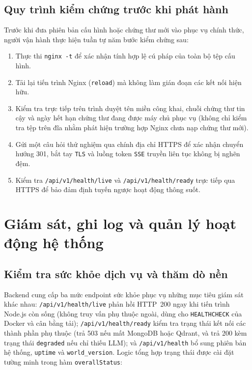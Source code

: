 \subsection{Quy trình kiểm chứng trước khi phát hành}
\label{subsec:kiem-chung-phat-hanh}

Trước khi đưa phiên bản cấu hình hoặc chứng thư mới vào phục vụ chính thức, người vận hành thực hiện tuần tự năm bước kiểm chứng sau:

\begin{enumerate}
    \item Thực thi \texttt{nginx -\allowbreak{}t} để xác nhận tính hợp lệ cú pháp của toàn bộ tệp cấu hình.
    \item Tải lại tiến trình Nginx (\texttt{reload}) mà không làm gián đoạn các kết nối hiện hữu.
    \item Kiểm tra trực tiếp trên trình duyệt tên miền công khai, chuỗi chứng thư tin cậy và ngày hết hạn chứng thư đang được máy chủ phục vụ (không chỉ kiểm tra tệp trên đĩa nhằm phát hiện trường hợp Nginx chưa nạp chứng thư mới).
    \item Gửi một câu hỏi thử nghiệm qua chính địa chỉ HTTPS để xác nhận chuyển hướng 301, bắt tay \texttt{TLS} và luồng token \texttt{SSE} truyền liên tục không bị nghẽn đệm.
    \item Kiểm tra \texttt{/\allowbreak{}api/\allowbreak{}v1/\allowbreak{}health/\allowbreak{}live} và \texttt{/\allowbreak{}api/\allowbreak{}v1/\allowbreak{}health/\allowbreak{}ready} trực tiếp qua HTTPS để bảo đảm định tuyến ngược hoạt động thông suốt.
\end{enumerate}

\section{Giám sát, ghi log và quản lý hoạt động hệ thống}
\label{sec:giam-sat-logging}

\subsection{Kiểm tra sức khỏe dịch vụ và thăm dò nền}
\label{subsec:health-probes}

Backend cung cấp ba mức endpoint sức khỏe phục vụ những mục tiêu giám sát khác nhau: \texttt{/\allowbreak{}api/\allowbreak{}v1/\allowbreak{}health/\allowbreak{}live} phản hồi HTTP~200 ngay khi tiến trình Node.js còn sống (không truy vấn phụ thuộc ngoài, dùng cho \texttt{HEALTHCHECK} của Docker và cân bằng tải); \texttt{/\allowbreak{}api/\allowbreak{}v1/\allowbreak{}health/\allowbreak{}ready} kiểm tra trạng thái kết nối các thành phần phụ thuộc (trả 503 nếu mất MongoDB hoặc Qdrant, và trả 200 kèm trạng thái \texttt{degraded} nếu chỉ thiếu LLM); và \texttt{/\allowbreak{}api/\allowbreak{}v1/\allowbreak{}health} bổ sung phiên bản hệ thống, \texttt{uptime} và \texttt{world\_\allowbreak{}version}. Logic tổng hợp trạng thái được cài đặt tường minh trong hàm \texttt{overallStatus}:

